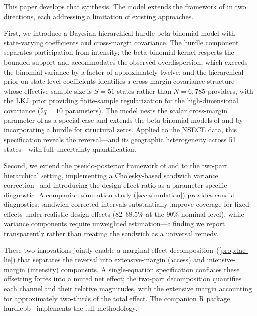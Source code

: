 
This paper develops that synthesis.  The model extends the framework of
\citet{GhosalEtAl2020} in two directions, each addressing a limitation
of existing approaches.

First, we introduce a Bayesian hierarchical hurdle beta-binomial
model with state-varying coefficients and cross-margin covariance.  The
hurdle component separates participation from intensity; the
beta-binomial kernel respects the bounded support and accommodates the
observed overdispersion, which exceeds the binomial variance by a factor
of approximately twelve; and the hierarchical prior on state-level
coefficients identifies a cross-margin covariance structure whose
effective sample size is $S = 51$ states rather than $N = 6{,}785$
providers, with the $\operatorname{LKJ}$ prior providing finite-sample regularization
for the high-dimensional covariance ($2q = 10$ parameters).  The model nests
the scalar cross-margin parameter of \citet{GhosalEtAl2020} as a special
case and extends the beta-binomial models of
\citet{BandyopadhyayEtAl2011} and \citet{WenEtAl2025} by incorporating a
hurdle for structural zeros.  Applied to the NSECE data, this
specification reveals the reversal---and its geographic
heterogeneity across 51 states---with full uncertainty quantification.

Second, we extend the pseudo-posterior framework of
\citet{SavitskyToth2016} and \citet{WilliamsSavitsky2021} to the
two-part hierarchical setting, implementing a Cholesky-based sandwich
variance correction~\citep{Binder1983, Pfeffermann1993} and introducing
the design effect ratio as a parameter-specific diagnostic.  A companion
simulation study (\cref{sec:simulation}) provides candid diagnostics:
sandwich-corrected intervals substantially improve coverage for fixed
effects under realistic design effects (82--88.5\% at the 90\% nominal
level), while variance components require
unweighted estimation---a finding we report transparently rather than
treating the sandwich as a universal remedy.

These two innovations jointly enable a marginal effect
decomposition~(\cref{prop:lae-lie}) that separates the reversal into
extensive-margin (access) and intensive-margin (intensity) components.
A single-equation specification conflates these offsetting forces into
a muted net effect; the two-part decomposition quantifies each channel
and their relative magnitudes, with the extensive margin accounting for
approximately two-thirds of the total effect.  The companion R package
\textsf{hurdlebb}~\citep{hurdlebb2026} implements the full methodology.


